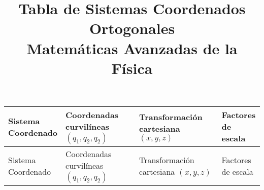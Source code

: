 \documentclass[12pt,landscape]{article}
\title{Tabla de Sistemas Coordenados Ortogonales \\ {\large Matemáticas Avanzadas de la Física}}
\date{ }
\author{}
\numberwithin{equation}{section}
\begin{document}
\renewcommand\labelenumii{\theenumi.{\arabic{enumii}}}
\maketitle
\fontsize{14}{14}\selectfont
\vspace{-2cm}
{\renewcommand{\arraystretch}{4}%
\begin{longtable}{| l | p{5cm} | l | p{7.3cm} |}
\hline

\makecell{Sistema \\ Coordenado} & \makecell{Coordenadas \\ curvilíneas \\ $(q_{1}, q_{2}, q_{2})$} & \makecell{Transformación cartesiana \\ $(x, y,z)$} & \makecell{Factores \\ de escala} \\ \hline
\endfirsthead

\hline
\makecell{Sistema \\ Coordenado} & \makecell{Coordenadas \\ curvilíneas \\ $(q_{1}, q_{2}, q_{2})$} & \makecell{Transformación cartesiana \\ $(x, y,z)$} & \makecell{Factores \\ de escala} \\ \hline
\endhead


\end{longtable}}
\end{document}
